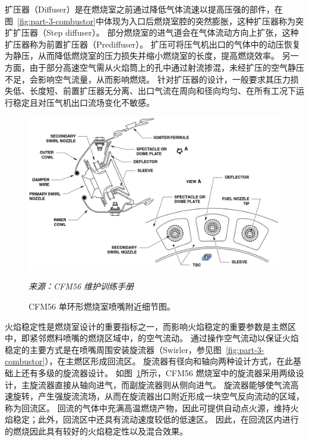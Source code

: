 扩压器（Diffuser）是在燃烧室之前通过降低气体流速以提高压强的部件，在图~\ref{fig:part-3-combustor}中体现为入口后燃烧室腔的突然膨胀，这种扩压器称为突扩扩压器（Step diffuser）。
部分燃烧室的进气道会在气体流动方向上扩张，这种扩压器称为前置扩压器（Prediffuser）。
扩压可将压气机出口的气体中的动压恢复为静压，从而降低燃烧室的压力损失并缩小燃烧室的长度，提高燃烧效率。
另一方面，由于部分高速空气需从火焰筒上的孔中通过射流掺混，未经扩压的空气静压不足，会影响空气流量，从而影响燃烧。
针对扩压器的设计，一般要求其压力损失低、长度短、前置扩压器无分离、出口气流在周向和径向均匀、在所有工况下运行稳定且对压气机出口流场变化不敏感。

\begin{figure}[!ht]
    \centering
    \includegraphics[width=0.8\linewidth]{combustor-nozzle.png}
    \caption{CFM56 单环形燃烧室喷嘴附近细节图。}
    \label{fig:part-3-combustor-nozzle}
    \textit{\small 来源：CFM56 维护训练手册}
\end{figure}

火焰稳定性是燃烧室设计的重要指标之一，而影响火焰稳定的重要参数是主燃区中，即紧邻燃料喷嘴的燃烧区域中，的空气流动。
通过操作空气流动以保证火焰稳定的主要方式是在喷嘴周围安装旋流器（Swirler，参见图~\ref{fig:part-3-combustor}），在主燃区形成回流区。
旋流器有径向和轴向两种设计方式，在此基础上还有多级的旋流器设计。
如图~\ref{fig:part-3-combustor-nozzle}所示，CFM56 燃烧室中的旋流器采用两级设计，主旋流器直接从轴向进气，而副旋流器则从侧向进气。
旋流器能够使气流高速旋转，产生强旋流流场，从而在旋流器出口附近形成一块空气反向流动的区域，称为回流区。
回流的气体中充满高温燃烧产物，因此可提供自动点火源，维持火焰稳定；此外，回流区中还具有流动速度较低的低速区。
因此，在回流区内进行的燃烧因此具有较好的火焰稳定性以及混合效果。
